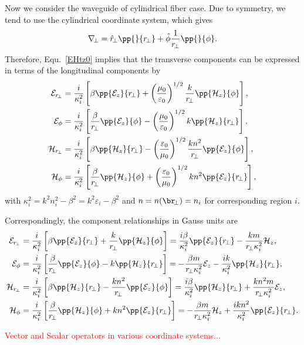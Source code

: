 Now we consider the waveguide of cylindrical fiber case. Due to symmetry, we tend to use the 
cylindrical coordinate system, which gives 
\begin{align}
\nabla\!_\perp = \hat{r}\!_\perp \pp{}{r\!_\perp} + \hat{\phi} \frac{1}{r\!_\perp} \pp{}{\phi}.
\end{align}
Therefore, Equ.~\ref{EHtz0} implies that the transverse components can be expressed in terms of the 
longitudinal components by
\begin{subequations}
\begin{align}
\mathcal{E}_{r\!_\perp} &= \frac{i}{\kappa_i^2} \left[ \beta \pp{\mathcal{E}_z }{r\!_\perp} + 
\left(\frac{\mu_0}{\varepsilon_0} \right)^{1/2}  \frac{k}{r\!_\perp} 
\pp{\mathcal{H}_z}{\phi} \right], \\
\mathcal{E}_\phi &= \frac{i}{\kappa_i^2} \left[\frac{\beta}{r\!_\perp} 
\pp{\mathcal{E}_z}{\phi} -\left(\frac{\mu_0}{\varepsilon_0} \right) ^{1/2} k 
\pp{\mathcal{H}_z}{r\!_\perp} 
\right],\\
\mathcal{H}_{r\!_\perp} &= \frac{i}{\kappa_i^2} \left[ \beta \pp{\mathcal{H}_z}{r\!_\perp} 
-\left(\frac{\varepsilon_0}{\mu_0} \right)^{1/2} \frac{kn^2}{r\!_\perp}\pp{\mathcal{E}_z}{\phi} \right],\\
\mathcal{H}_\phi &= \frac{i}{\kappa_i^2} \left[ \frac{\beta}{r\!_\perp} \pp{\mathcal{H}_z}{\phi} + 
\left(\frac{\varepsilon_0}{\mu_0} \right)^{1/2} kn^2 \pp{\mathcal{E}_z}{r\!_\perp} \right],
\end{align}
\end{subequations}
with $ \kappa_i^2= k^2n_i^2-\beta^2=k^2 \varepsilon_i -\beta^2  $ and $ n=n(\br\!_\perp)=n_i$ for corresponding region $i$. 

Correspondingly, the component relationships in Gauss units are
\begin{subequations}\label{EHzgauss}
\begin{align}
\mathcal{E}_{r\!_\perp} &= \frac{i}{\kappa_i^2} \left[ \beta \pp{\mathcal{E}_z }{r\!_\perp} + 
  \frac{k}{r\!_\perp} 
\pp{\mathcal{H}_z}{\phi} \right]= \frac{i\beta}{\kappa_i^2} \pp{\mathcal{E}_z }{r\!_\perp} - 
  \frac{km}{r\!_\perp \kappa_i^2} {\mathcal{H}_z}, \\
\mathcal{E}_\phi &= \frac{i}{\kappa_i^2} \left[\frac{\beta}{r\!_\perp} 
\pp{\mathcal{E}_z}{\phi} - k 
\pp{\mathcal{H}_z}{r\!_\perp} 
\right] = -\frac{\beta m}{r\!_\perp \kappa_i^2} 
{\mathcal{E}_z} - \frac{ik}{\kappa_i^2} 
\pp{\mathcal{H}_z}{r\!_\perp},\\
\mathcal{H}_{r\!_\perp} &= \frac{i}{\kappa_i^2} \left[ \beta \pp{\mathcal{H}_z}{r\!_\perp} 
- \frac{kn^2}{r\!_\perp}\pp{\mathcal{E}_z}{\phi} \right]= \frac{i\beta}{\kappa_i^2} \pp{\mathcal{H}_z}{r\!_\perp} 
+ \frac{kn^2m}{r\!_\perp \kappa_i^2} {\mathcal{E}_z},\\
\mathcal{H}_\phi &= \frac{i}{\kappa_i^2} \left[ \frac{\beta}{r\!_\perp} \pp{\mathcal{H}_z}{\phi} + 
 kn^2 \pp{\mathcal{E}_z}{r\!_\perp} \right] = -\frac{\beta m}{r\!_\perp \kappa_i^2} {\mathcal{H}_z} + 
  \frac{ikn^2}{\kappa_i^2} \pp{\mathcal{E}_z}{r\!_\perp}.
\end{align}
\end{subequations}


\textcolor{red}{Vector and Scalar operators in various coordinate systems...}

